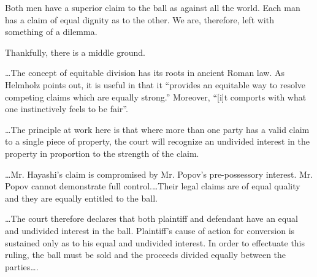 Both men have a superior claim to the ball as against all the world. Each man
has a claim of equal dignity as to the other. We are, therefore, left with
something of a dilemma.

Thankfully, there is a middle ground.

\ldots The concept of equitable division has its roots in ancient Roman law. As
Helmholz points out, it is useful in that it ``provides an equitable way to
resolve competing claims which are equally strong.'' Moreover, ``[i]t comports
with what one instinctively feels to be fair''. 

\ldots The principle at work here is that where more than one party has a valid
claim to a single piece of property, the court will recognize an undivided
interest in the property in proportion to the strength of the claim.

\ldots Mr. Hayashi's claim is compromised by Mr. Popov's pre-possessory
interest. Mr. Popov cannot demonstrate full control.\ldots Their legal claims
are of equal quality and they are equally entitled to the ball.

\ldots The court therefore declares that both plaintiff and defendant have an
equal and undivided interest in the ball. Plaintiff's cause of action for
conversion is sustained only as to his equal and undivided interest. In order to
effectuate this ruling, the ball must be sold and the proceeds divided equally
between the parties\ldots .

